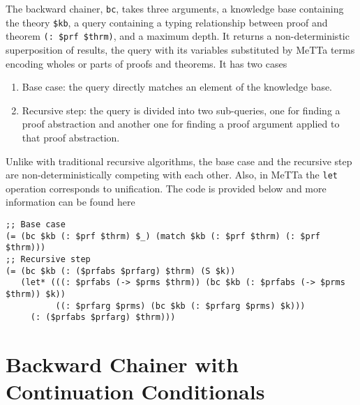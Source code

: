 \documentclass{easychair}
\begin{document}
The backward chainer, \texttt{bc}, takes three arguments, a knowledge
base containing the theory \texttt{\$kb}, a query containing a typing
relationship between proof and theorem \texttt{(: \$prf \$thrm)}, and
a maximum depth.  It returns a non-deterministic superposition of
results, the query with its variables substituted by MeTTa terms
encoding wholes or parts of proofs and theorems.  It has two cases
\begin{enumerate}
\item Base case: the query directly matches an element of the
  knowledge base.
\item Recursive step: the query is divided into two sub-queries, one
  for finding a proof abstraction and another one for finding a proof
  argument applied to that proof abstraction.
\end{enumerate}
Unlike with traditional recursive algorithms, the base case and the
recursive step are non-deterministically competing with each other.
Also, in MeTTa the \texttt{let} operation corresponds to unification.
The code is provided below and more information can be found
here~\cite{TODO} \small{
\begin{verbatim}
;; Base case
(= (bc $kb (: $prf $thrm) $_) (match $kb (: $prf $thrm) (: $prf $thrm)))
;; Recursive step
(= (bc $kb (: ($prfabs $prfarg) $thrm) (S $k))
   (let* (((: $prfabs (-> $prms $thrm)) (bc $kb (: $prfabs (-> $prms $thrm)) $k))
          ((: $prfarg $prms) (bc $kb (: $prfarg $prms) $k)))
     (: ($prfabs $prfarg) $thrm)))
\end{verbatim}
}

\section{Backward Chainer with Continuation Conditionals}
\label{app:backward-chainer-continuation-conditionals}
\end{document}

